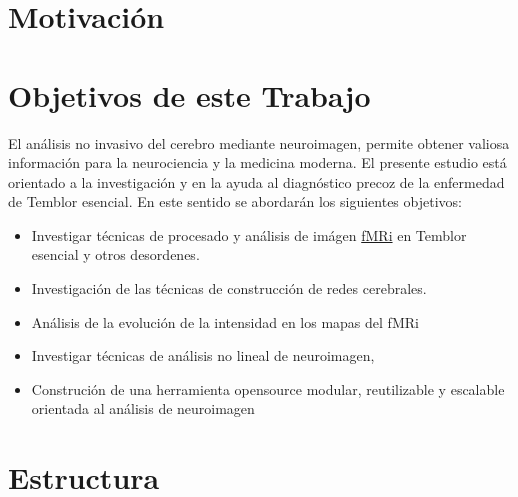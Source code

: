 \section{Motivación}


\section{Objetivos de este Trabajo}

El análisis no invasivo del cerebro mediante neuroimagen, permite obtener valiosa información para la neurociencia y la medicina moderna. El presente estudio está orientado a la investigación y en la ayuda al diagnóstico precoz de la enfermedad de Temblor esencial. En este sentido se abordarán los siguientes objetivos:

\begin{itemize}
\item Investigar técnicas de procesado y análisis de imágen \hyperref[glos:fmri]{fMRi} en Temblor esencial y otros desordenes.
\item Investigación de las técnicas de construcción de redes cerebrales.
\item Análisis de la evolución de la intensidad en los mapas del fMRi
\item Investigar técnicas de análisis no lineal de neuroimagen,
\item Construción de una herramienta opensource modular, reutilizable y escalable orientada al análisis de neuroimagen
\end{itemize}


\section{Estructura}
%
%
